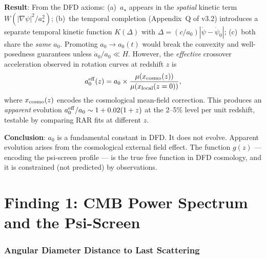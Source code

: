 \documentclass[11pt,a4paper]{article}
\newcommand{\astar}{a_\star}
\newcommand{\mufd}{\mu}
\begin{document}
\begin{tcolorbox}[colback=yellow!5!white, colframe=red!70!black,
  title=\textbf{TOP 5 FINDINGS --- WAVE 4, ITERATION 15}]
\begin{enumerate}
  \textbf{Result}: From the DFD axioms:
  (a)~$\astar$ appears in the \emph{spatial} kinetic term
  $W(|\nabla\psi|^2/\astar^2)$;
  (b)~the temporal completion (Appendix~Q of v3.2) introduces a
  separate temporal kinetic function $K(\Delta)$ with
  $\Delta = (c/a_0)|\dot\psi - \dot\psi_0|$;
  (c)~both share the \emph{same} $a_0$.
  Promoting $a_0 \to a_0(t)$ would break the convexity and
  well-posedness guarantees unless $\dot a_0/a_0 \ll H$.
  However, the \emph{effective} crossover acceleration observed in
  rotation curves at redshift $z$ is
  \begin{equation}
  a_0^{\rm eff}(z) = a_0 \times \frac{\mufd(x_{\rm cosmo}(z))}
  {\mufd(x_{\rm local}(z = 0))},
  \end{equation}
  where $x_{\rm cosmo}(z)$ encodes the cosmological mean-field
  correction.  This produces an \emph{apparent} evolution
  $a_0^{\rm eff}/a_0 \sim 1 + 0.02(1+z)$ at the 2--5\% level
  per unit redshift, testable by comparing RAR fits at different $z$.

  \textbf{Conclusion}: $a_0$ is a fundamental constant in DFD.
  It does not evolve.  Apparent evolution arises from the cosmological
  external field effect.  The function $g(z)$ --- encoding the
  psi-screen profile --- is the true free function in DFD cosmology,
  and it is constrained (not predicted) by observations.

\end{enumerate}

\end{tcolorbox}


\part{Finding 1: CMB Power Spectrum and the Psi-Screen}
\label{sec:cmb}


\section{Angular Diameter Distance to Last Scattering}
\label{sec:DA-star}
\end{document}
